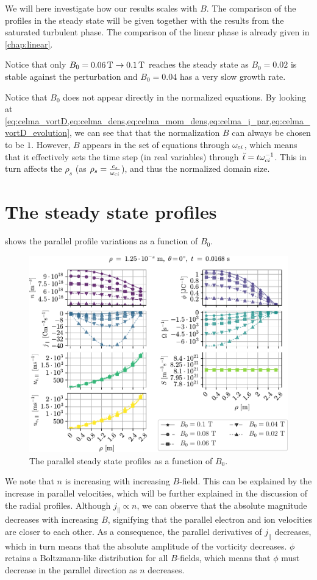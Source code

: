 %
We will here investigate how our results scales with $B$.
The comparison of the profiles in the steady state will be given together with the results from the saturated turbulent phase.
The comparison of the linear phase is already given in \cref{chap:linear}.

Notice that only $B_0 = 0.06\, \text{T} \to 0.1\, \text{T}$ reaches the steady state as $B_0 = 0.02$ is stable against the perturbation and $B_0 = 0.04$ has a very slow growth rate.

Notice that $B_0$ does not appear directly in the normalized equations.
By looking at \cref{eq:celma_vortD,eq:celma_dens,eq:celma_mom_dens,eq:celma_j_par,eq:celma_vortD_evolution}, we can see that that the normalization $B$ can always be chosen to be $1$.
However, $B$ appears in the set of equations through $\omega_{ci}$, which means that it effectively sets the time step (in real variables) through $\breve{t}=t\omega_{ci}^{-1}$.
This in turn affects the $\rho_s$ (as $\rho_s=\frac{c_s}{\omega_{ci}}$), and thus the normalized domain size.

\section{The steady state profiles}
\label{sec:BScanSS}
%
 shows the parallel profile variations as a function of $B_0$.
%
\begin{figure}[htb]
    \centering
    \includegraphics{fig/results/bScan/BScanPar}
    \caption{The parallel steady state profiles as a function of $B_0$.}
    \label{fig:BScanPar}
\end{figure}
%
We note that $n$ is increasing with increasing $B$-field.
This can be explained by the increase in parallel velocities, which will be further explained in the discussion of the radial profiles.
Although $j_\| \propto n$, we can observe that the absolute magnitude decreases with increasing $B$, signifying that the parallel electron and ion velocities are closer to each other.
As a consequence, the parallel derivatives of $j_\|$ decreases, which in turn means that the absolute amplitude of the vorticity decreases.
$\phi$ retains a Boltzmann-like distribution for all $B$-fields, which means that $\phi$ must decrease in the parallel direction as $n$ decreases.

